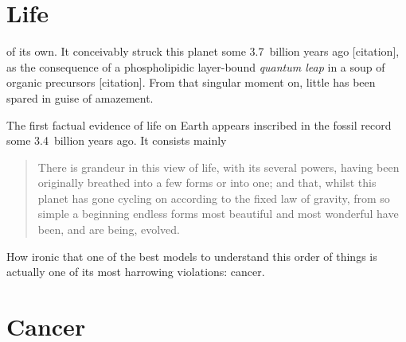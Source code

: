 \documentclass{tufte-book}
\begin{document}
\section{Life}

 of its own. It conceivably struck this planet some
3.7~billion years ago [citation], as the consequence of a phospholipidic
layer-bound \emph{quantum leap} in a soup of organic precursors
[citation]. From that singular moment on, little has been spared in guise of
amazement.

The first factual evidence of life on Earth appears inscribed in the fossil
record some 3.4~billion years ago. It consists mainly

\begin{quotation}
There is grandeur in this view of life, with its several powers, having been
originally breathed into a few forms or into one; and that, whilst this planet
has gone cycling on according to the fixed law of gravity, from so simple a
beginning endless forms most beautiful and most wonderful have been, and are
being, evolved.
\end{quotation}

How ironic that one of the best models to understand this order of things is
actually one of its most harrowing violations: cancer.

\section{Cancer}
\end{document}
